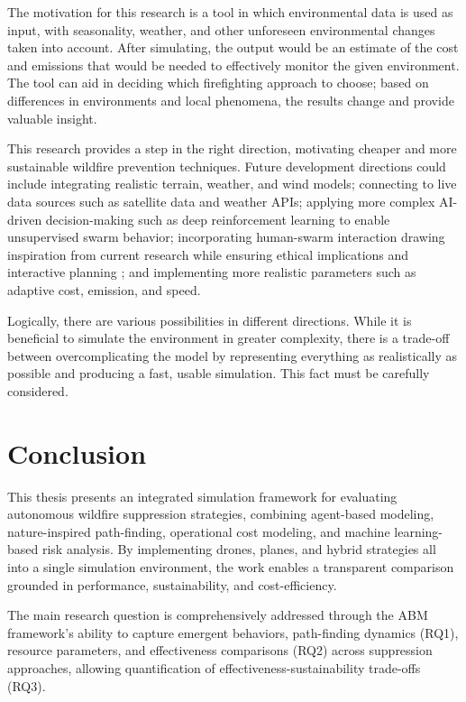 \documentclass[11pt, a4paper]{article}
\begin{document}
The motivation for this research is a tool in which environmental data is used as input, with seasonality, weather, and other unforeseen environmental changes taken into account. After simulating, the output would be an estimate of the cost and emissions that would be needed to effectively monitor the given environment. The tool can aid in deciding which firefighting approach to choose; based on differences in environments and local phenomena, the results change and provide valuable insight. 

This research provides a step in the right direction, motivating cheaper and more sustainable wildfire prevention techniques. Future development directions could include integrating realistic terrain, weather, and wind models; connecting to live data sources such as satellite data and weather APIs; applying more complex AI-driven decision-making such as deep reinforcement learning to enable unsupervised swarm behavior; incorporating human-swarm interaction drawing inspiration from current research while ensuring ethical implications and interactive planning \citep{lewisHumanFactorsIssues2012}; and implementing more realistic parameters such as adaptive cost, emission, and speed.

Logically, there are various possibilities in different directions. While it is beneficial to simulate the environment in greater complexity, there is a trade-off between overcomplicating the model by representing everything as realistically as possible and producing a fast, usable simulation. This fact must be carefully considered.

\section{Conclusion}

This thesis presents an integrated simulation framework for evaluating autonomous wildfire suppression strategies, combining agent-based modeling, nature-inspired path-finding, operational cost modeling, and machine learning-based risk analysis. By implementing drones, planes, and hybrid strategies all into a single simulation environment, the work enables a transparent comparison grounded in performance, sustainability, and cost-efficiency.

The main research question is comprehensively addressed through the ABM framework's ability to capture emergent behaviors, path-finding dynamics (RQ1), resource parameters, and effectiveness comparisons (RQ2) across suppression approaches, allowing quantification of effectiveness-sustainability trade-offs (RQ3).
\end{document}
